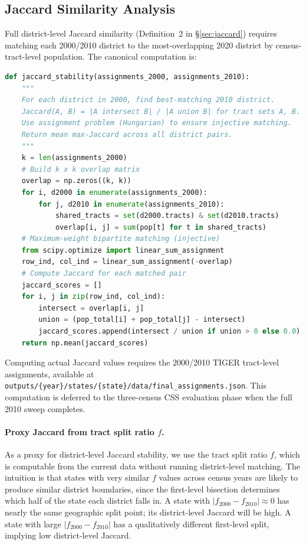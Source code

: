 \subsection{Jaccard Similarity Analysis}
\label{sec:jaccard-analysis}

Full district-level Jaccard similarity (Definition~2 in \S\ref{sec:jaccard})
requires matching each 2000/2010 district to the most-overlapping 2020 district
by census-tract-level population.
The canonical computation is:

\begin{lstlisting}[language=Python, basicstyle=\small\ttfamily, caption={Jaccard stability pseudocode.}]
def jaccard_stability(assignments_2000, assignments_2010):
    """
    For each district in 2000, find best-matching 2010 district.
    Jaccard(A, B) = |A intersect B| / |A union B| for tract sets A, B.
    Use assignment problem (Hungarian) to ensure injective matching.
    Return mean max-Jaccard across all district pairs.
    """
    k = len(assignments_2000)
    # Build k x k overlap matrix
    overlap = np.zeros((k, k))
    for i, d2000 in enumerate(assignments_2000):
        for j, d2010 in enumerate(assignments_2010):
            shared_tracts = set(d2000.tracts) & set(d2010.tracts)
            overlap[i, j] = sum(pop[t] for t in shared_tracts)
    # Maximum-weight bipartite matching (injective)
    from scipy.optimize import linear_sum_assignment
    row_ind, col_ind = linear_sum_assignment(-overlap)
    # Compute Jaccard for each matched pair
    jaccard_scores = []
    for i, j in zip(row_ind, col_ind):
        intersect = overlap[i, j]
        union = (pop_total[i] + pop_total[j] - intersect)
        jaccard_scores.append(intersect / union if union > 0 else 0.0)
    return np.mean(jaccard_scores)
\end{lstlisting}

Computing actual Jaccard values requires the 2000/2010 TIGER tract-level
assignments, available at
\texttt{outputs/\{year\}/states/\{state\}/data/final\_assignments.json}.
This computation is deferred to the three-census CSS evaluation phase when
the full 2010 sweep completes.

\paragraph{Proxy Jaccard from tract split ratio $f$.}
As a proxy for district-level Jaccard stability, we use the tract split
ratio $f$, which is computable from the current data without running
district-level matching.
The intuition is that states with very similar $f$ values across census years
are likely to produce similar district boundaries, since the first-level
bisection determines which half of the state each district falls in.
A state with $|f_{2000} - f_{2010}| \approx 0$ has nearly the same geographic
split point; its district-level Jaccard will be high.
A state with large $|f_{2000} - f_{2010}|$ has a qualitatively different
first-level split, implying low district-level Jaccard.

